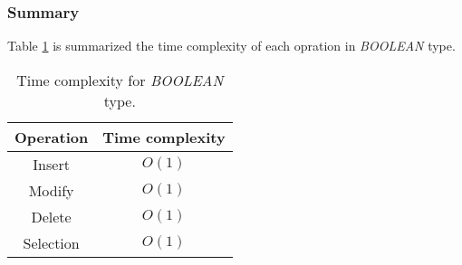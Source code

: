 \subsubsection{Summary}

Table \ref{table:algorithm:boolean:summary:time_complexity} is summarized the time complexity of each opration in \textit{BOOLEAN} type.

\begin{table}[h]
\centering
\caption{Time complexity for \textit{BOOLEAN} type.}
\label{table:algorithm:boolean:summary:time_complexity}
\begin{tabular}{|c|c|}

\hline
\multicolumn{1}{|c|}{Operation} &
\multicolumn{1}{c|}{Time complexity} \\

\hline
\multicolumn{1}{|c|}{Insert} &
\multicolumn{1}{c|}{$O(1)$} \\

\hline
\multicolumn{1}{|c|}{Modify} &
\multicolumn{1}{c|}{$O(1)$} \\

\hline
\multicolumn{1}{|c|}{Delete} &
\multicolumn{1}{c|}{$O(1)$} \\

\hline
\multicolumn{1}{|c|}{Selection} &
\multicolumn{1}{c|}{$O(1)$} \\

\hline
\end{tabular}
\end{table}
